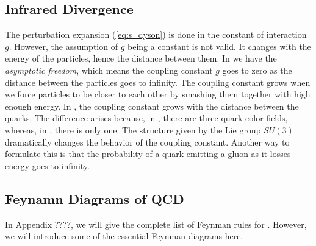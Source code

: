\subsection{Infrared Divergence}
\label{sec:IR_div}
The perturbation expansion (\ref{eq:s_dyson}) is done in the constant of interaction $g$. 
However, the assumption of $g$ being a constant is not valid.
It changes with the energy of the particles, hence the distance between them. 
In \QED we have the \emph{asymptotic freedom}, which means the coupling constant $g$ goes to zero as the distance between the particles goes to infinity.
The coupling constant grows when we force particles to be closer to each other by smashing them together with high enough energy.
In \QCD, the coupling constant grows with the distance between the quarks.
The difference arises because, in \QCD, there are three quark color fields, whereas, in \QED, there is only one.
The structure given by the Lie group $SU(3)$ dramatically changes the behavior of the coupling constant.
Another way to formulate this is that the probability of a quark emitting a gluon as it losses energy goes to infinity.


\subsection{Feynamn Diagrams of QCD}
In Appendix ????, we will give the complete list of Feynman rules for \QCD.
However, we will introduce some of the essential Feynman diagrams here.

